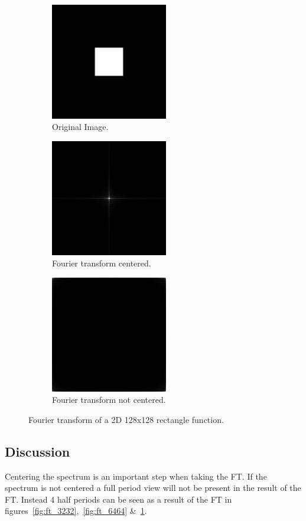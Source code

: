 \documentclass[letter]{article}
\begin{document}
\begin{figure}[hbtp]
  \centering
  \begin{subfigure}{5.1cm}
    \includegraphics[width=5.1cm]{images/rect_512_128x128.png}
    \caption{Original Image.}
  \end{subfigure}
  \begin{subfigure}{5.1cm}
    \includegraphics[width=5.1cm]{images/rect_512_128x128_FU_centered.png}
    \caption{Fourier transform centered.}
  \end{subfigure}
  \begin{subfigure}{5.1cm}
    \includegraphics[width=5.1cm]{images/rect_512_128x128_FU.png}
    \caption{Fourier transform not centered.}
  \end{subfigure}
  \caption{Fourier transform of a 2D 128x128 rectangle function.}
  \label{fig:ft_128128}
\end{figure}
\subsection{Discussion}
Centering the spectrum is an important step when taking the FT. If the spectrum is not centered a full period view will not be present in the result of the FT. Instead 4 half periods can be seen as a result of the FT in figures~\ref{fig:ft_3232},~\ref{fig:ft_6464} \&~\ref{fig:ft_128128}.
\end{document}
